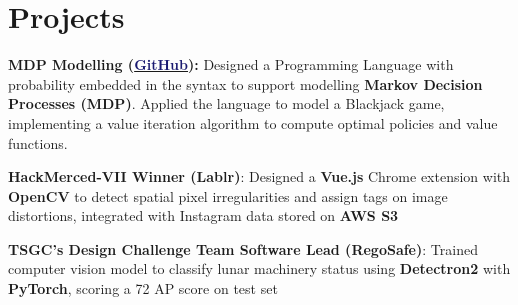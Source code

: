 \documentclass[letterpaper,11pt]{article}
\begin{document}
\section{Projects}
\begin{itemize}[]
  \small
        {\item{\textbf{MDP Modelling (\href{https://github.com/samz331/blackjack}{\textcolor{MidnightBlue}{GitHub}}):}
        {Designed a Programming Language with probability embedded in the syntax to support modelling \textbf{Markov Decision Processes (MDP)}. Applied the language to model a Blackjack game, implementing a value iteration algorithm to compute optimal policies and value functions.
        }}}  \vspace{-4pt}

        {\item{
        \textbf{HackMerced-VII Winner (Lablr)}{: Designed a \textbf{Vue.js} Chrome extension with \textbf{OpenCV} to detect spatial pixel irregularities and assign tags on image distortions, integrated with Instagram data stored on \textbf{AWS S3}
        }}} \vspace{-7pt}

        {\item{\textbf{TSGC's Design Challenge Team Software Lead (RegoSafe)}{: Trained computer vision model to classify lunar machinery status using
          \textbf{Detectron2} with \textbf{PyTorch}, scoring a 72 AP score on test set
        }}}  \vspace{-7pt}









\end{itemize}
\end{document}
